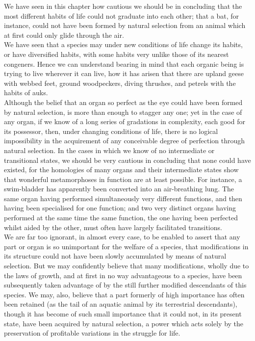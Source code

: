 \indent We have seen in this chapter how cautious we should be in concluding that the most different habits of life could not graduate into each other; that a bat, for instance, could not have been formed by natural selection from an animal which at first could only glide through the air.\\
\indent We have seen that a species may under new conditions of life change its habits, or have diversified habits, with some habits very unlike those of its nearest congeners. Hence we can understand bearing in mind that each organic being is trying to live wherever it can live, how it has arisen that there are upland geese with webbed feet, ground woodpeckers, diving thrushes, and petrels with the habits of auks.\\
\indent Although the belief that an organ so perfect as the eye could have been formed by natural selection, is more than enough to stagger any one; yet in the case of any organ, if we know of a long series of gradations in complexity, each good for its possessor, then, under changing conditions of life, there is no logical impossibility in the acquirement of any conceivable degree of perfection through natural selection. In the cases in which we know of no intermediate or transitional states, we should be very cautious in concluding that none could have existed, for the homologies of many organs and their intermediate states show that wonderful metamorphoses in function are at least possible. For instance, a swim-bladder has apparently been converted into an air-breathing lung. The same organ having performed simultaneously very different functions, and then having been specialised for one function; and two very distinct organs having performed at the same time the same function, the one having been perfected whilst aided by the other, must often have largely facilitated transitions.\\
\indent We are far too ignorant, in almost every case, to be enabled to assert that any part or organ is so unimportant for the welfare of a species, that modifications in its structure could not have been slowly accumulated by means of natural selection. But we may confidently believe that many modifications, wholly due to the laws of growth, and at first in no way advantageous to a species, have been subsequently taken advantage of by the still further modified descendants of this species. We may, also, believe that a part formerly of high importance has often been retained (as the tail of an aquatic animal by its terrestrial descendants), though it has become of such small importance that it could not, in its present state, have been acquired by natural selection, a power which acts solely by the preservation of profitable variations in the struggle for life.\\
